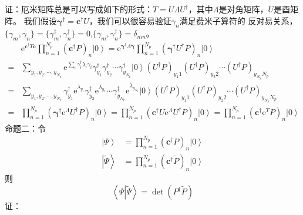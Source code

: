 \documentclass[UTF8,cs4size]{ctexart}
\def\ee{\mathrm e}
\begin{document}
\noindent 证：厄米矩阵总是可以写成如下的形式：$T=U \Lambda U^{\dag}$，其中$\Lambda$是对角矩阵，$U$是酉矩阵。
我们假设$\boldsymbol{\gamma}^{\dag}=\mathbf{c^{\dag}}U$，我们可以很容易验证$\gamma_n$满足费米子算符的
反对易关系，$\{\gamma_m,\gamma_n\}=\{\gamma^{\dag}_m,\gamma^{\dag}_n\}=0$,$\{\gamma_m,\gamma^{\dag}_n\}=\delta_{mn}$。
\[
    \begin{aligned}
        &\ee^{\mathbf{c^{\dag}}T \mathbf{c}} \prod_{n=1}^{N_p}\left( \mathbf{c^{\dag}} P\right)_{n}
            \left|0\right>
        =\ee^{\boldsymbol{\gamma^{\dag}} \Lambda \boldsymbol{\gamma}} \prod_{n=1}^{N_p}
            \left(\boldsymbol{\gamma^{\dag}} U^{\dag} P\right)_n  \left|0\right>\\
        =&\sum_{y_1,y_2, \cdots, y_{N_p} }\ee^{\sum_{i}\gamma^{\dag}_i \lambda_i \gamma_i}  \gamma^{\dag}_{y_1} \gamma^{\dag}_{y_2}
        \cdots \gamma^{\dag}_{y_{N_p}} \left|0\right> \left(U^{\dag} P\right)_{y_1 1}
        \left(U^{\dag} P\right)_{y_2 2} \cdots \left(U^{\dag} P\right)_{y_{N_p} N_p}\\
        =&\sum_{y_1,y_2, \cdots, y_{N_p} } \gamma^{\dag}_{y_1} \ee^{\lambda_{y_1}} \gamma^{\dag}_{y_2}
        \ee^{\lambda_{y_2}}\cdots \gamma^{\dag}_{y_{N_p}} \ee^{\lambda_{y_{N_p}}} \left|0\right> \left(U^{\dag} P\right)_{y_1 1}
        \left(U^{\dag} P\right)_{y_2 2} \cdots \left(U^{\dag} P\right)_{y_{N_p} N_p}\\
        =&\prod_{n=1}^{N_p} \left(\boldsymbol{\gamma^{\dag}}\ee^{\Lambda} U^{\dag} P\right)_n \left|0\right>
        =\prod_{n=1}^{N_p} \left(\mathbf{c^{\dag}} U \ee^{\Lambda} U^{\dag} P\right)_n \left|0\right>
        =\prod_{n=1}^{N_p}\left( \mathbf{c^{\dag}} \ee^{T} P\right)_{n}\left|0\right>
    \end{aligned}
\]
命题二：令
\[
    \begin{aligned}
        \left| \Psi \right> &= \prod_{n=1}^{N_p}\left( \mathbf{c^{\dag}} P\right)_{n} \left|0\right> \\
        \left| \tilde{\Psi} \right> &= \prod_{n=1}^{N_p}\left( \mathbf{c^{\dag}} \tilde{P}\right)_{n} \left|0\right>
    \end{aligned} 
\]
则
\[
    \left< \Psi \left| \tilde{\Psi} \right. \right> = \det\left( P^{\dag} \tilde{P}\right)    
\]
证：
\end{document}
